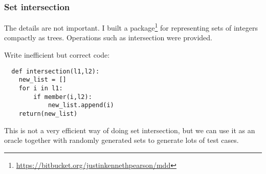 \documentclass{beamer}
\begin{document}
\begin{frame}[fragile]
  \frametitle{Set intersection}

The details are not important.  I built a
package\footnote{\url{https://bitbucket.org/justinkennethpearson/mdd}} for
representing sets of integers compactly as trees. Operations such as
intersection were provided.

Write inefficient but correct code:
\begin{lstlisting}
  def intersection(l1,l2):
    new_list = []
    for i in l1:
        if member(i,l2):
            new_list.append(i)
    return(new_list)
\end{lstlisting}

This is not a very efficient way of doing set intersection, but we can use it as
an oracle together with randomly generated sets to generate lots of test
cases. 
\end{frame}
\end{document}
